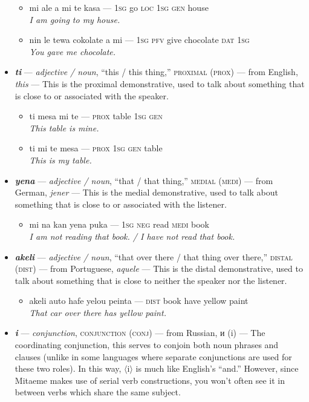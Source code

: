 \documentclass[a4paper, titlepage]{article}
\begin{document}
\begin{itemize}
	\begin{itemize}
		\item mi ale a mi te kasa — \textsc{1sg} go \textsc{loc 1sg gen} house \\\textit{I am going to my house.}
		\item nin le tewa cokolate a mi — \textsc{1sg pfv} give chocolate \textsc{dat 1sg} \\\textit{You gave me chocolate.}
	\end{itemize}
	\item \textbf{\textit{ti}} — \textit{adjective / noun}, ``this / this thing,'' \textsc{proximal (prox)} — from English, \textit{this} — This is the proximal demonstrative, used to talk about something that is close to or associated with the speaker.
	\begin{itemize}
		\item ti mesa mi te — \textsc{prox} table \textsc{1sg gen} \\\textit{This table is mine.}
		\item ti mi te mesa — \textsc{prox 1sg gen} table \\\textit{This is my table.}
	\end{itemize}
	\item \textbf{\textit{yena}} — \textit{adjective / noun}, ``that / that thing,'' \textsc{medial (medi)}  — from German, \textit{jener} — This is the medial demonstrative, used to talk about something that is close to or associated with the listener.
	\begin{itemize}
		\item mi na kan yena puka — \textsc{1sg neg} read \textsc{medi} book \\\textit{I am not reading that book. / I have not read that book.}
	\end{itemize}
	\item \textbf{\textit{akeli}} — \textit{adjective / noun}, ``that over there / that thing over there,'' \textsc{distal (dist)}  — from Portuguese, \textit{aquele} — This is the distal demonstrative, used to talk about something that is close to neither the speaker nor the listener.
	\begin{itemize}
		\item akeli auto hafe yelou peinta — \textsc{dist} book have yellow paint \\\textit{That car over there has yellow paint.}
	\end{itemize}
	\item \textbf{\textit{i}} — \textit{conjunction}, \textsc{conjunction (conj)}  — from Russian, и (i) — The coordinating conjunction, this serves to conjoin both noun phrases and clauses (unlike in some languages where separate conjunctions are used for these two roles). In this way, $\langle$i$\rangle$ is much like English's ``and.'' However, since Mitaeme makes use of serial verb constructions, you won't often see it in between verbs which share the same subject.

\end{itemize}
\end{document}
